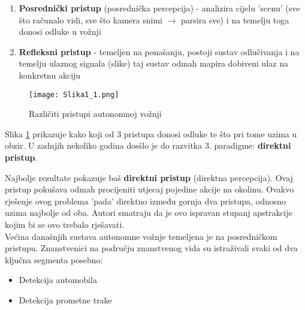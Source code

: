 \documentclass[seminar, utf8, numeric]{fer}
\begin{document}
\begin{enumerate}
	\item{\textbf{Posrednički pristup} (posrednička percepcija) - analizira cijelu 'scenu' (sve što računalo vidi, sve što kamera snimi $\rightarrow$ parsira sve) i na temelju toga donosi odluke u vožnji}
	
	\item{\textbf{Refleksni pristup} - temeljen na ponašanju, postoji sustav odlučivanja i na temelju ulaznog signala (slike) taj sustav odmah mapira dobiveni ulaz na konkretnu akciju}
\end{enumerate}	

\begin{figure}[h]
\centering
\texttt{[image: Slika1\_1.png]}
\caption{Različiti pristupi autonomnoj vožnji}
\label{fig:pristupi_autonomnoj_vožnji}
\end{figure}

Slika \ref{fig:pristupi_autonomnoj_vožnji} prikazuje kako koji od 3 pristupa donosi odluke te što pri tome uzima u obzir. U zadnjih nekoliko godina dosšlo je do razvitka 3. paradigme: \textbf{direktni pristup}.

Najbolje rezultate pokazuje baš \textbf{direktni pristup} (direktna percepcija). Ovaj pristup pokušava odmah procijeniti utjecaj pojedine akcije na okolinu. Ovakvo rješenje ovog problema 'pada' direktno između gornja dva pristupa, odnosno uzima najbolje od oba. Autori smatraju da je ovo ispravan stupanj apstrakcije kojim bi se ovo trebalo rješavati. \\ 

Većina današnjih sustava autonomne vožnje temeljena je na posredničkom pristupu. Znanstvenici na području znanstvenog vida su istraživali svaki od dva ključna segmenta posebno:

\begin{itemize}
	\item{Detekcija automobila}
	\item{Detekcija prometne trake}
\end{itemize}
\end{document}
